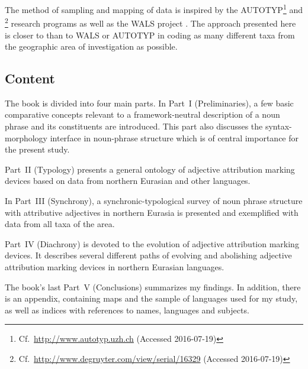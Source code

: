 The method of sampling and mapping of data is inspired by the \textsc{AUTOTYP}\footnote{Cf.~\url{http://www.autotyp.uzh.ch} (Accessed 2016-07-19)} and \textsc{}\footnote{Cf.~\url{http://www.degruyter.com/view/serial/16329} (Accessed 2016-07-19)} research programs as well as the \textsc{WALS} project \citep{walsOnline2013}. The approach presented here is closer to \textsc{} than to \textsc{WALS} or \textsc{AUTOTYP} in coding as many different taxa from the geographic area of investigation as possible.

\subsection*{Content}
The book is divided into four main parts. In Part~I (Preliminaries), a few basic comparative concepts relevant to a framework-neutral description of a noun phrase and its constituents are introduced. This part also discusses the syntax-morphology interface in noun-phrase structure which is of central importance for the present study.

Part~II (Typology) presents a general ontology of adjective attribution marking devices based on data from northern Eurasian and other languages.

In Part~III (Synchrony), a synchronic-typological survey of noun phrase structure with attributive adjectives in northern Eurasia is presented and exemplified with data from all taxa of the area.

Part~IV (Diachrony) is devoted to the evolution of adjective attribution marking devices. It describes several different paths of evolving and abolishing adjective attribution marking devices in northern Eurasian languages.

The book's last Part~V (Conclusions) summarizes my findings. In addition, there is an appendix, containing maps and the sample of languages used for my study, as well as indices with references to names, languages and subjects.
